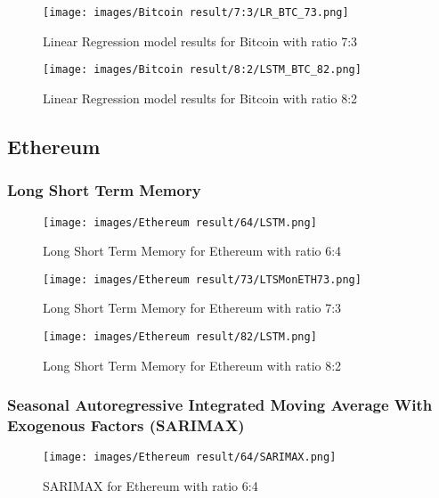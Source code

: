\documentclass{ieeeojies}
\begin{document}
\begin{figure}[H]
  \centering
\texttt{[image: images/Bitcoin result/7:3/LR\_BTC\_73.png]}\\
  \caption{Linear Regression model results for Bitcoin with ratio 7:3}
  \label{fig:lr_btc_73}
\end{figure}

\begin{figure}[H]
  \centering
\texttt{[image: images/Bitcoin result/8:2/LSTM\_BTC\_82.png]}
  \caption{Linear Regression model results for Bitcoin with ratio 8:2}
  \label{fig:lr_btc_82}
\end{figure}

\subsection{Ethereum}
\subsubsection{Long Short Term Memory}
\begin{figure}[H]
  \centering
\texttt{[image: images/Ethereum result/64/LSTM.png]}\\
  \caption{Long Short Term Memory for Ethereum with ratio 6:4}
  \label{fig:lstm_eth_64}
\end{figure}

\begin{figure}[H]
  \centering
\texttt{[image: images/Ethereum result/73/LTSMonETH73.png]}\\
  \caption{Long Short Term Memory for Ethereum with ratio 7:3}
  \label{fig:lstm_eth_73}
\end{figure}

\begin{figure}[H]
  \centering
\texttt{[image: images/Ethereum result/82/LSTM.png]}\\
  \caption{Long Short Term Memory for Ethereum with ratio 8:2}
  \label{fig:lstm_eth_82}
\end{figure}


\subsubsection{Seasonal Autoregressive Integrated
Moving Average With Exogenous Factors
(SARIMAX)}
\begin{figure}[H]
  \centering
\texttt{[image: images/Ethereum result/64/SARIMAX.png]}\\
  \caption{SARIMAX for Ethereum with ratio 6:4}
  \label{fig:sarimax_eth_64}
\end{figure}
\end{document}
